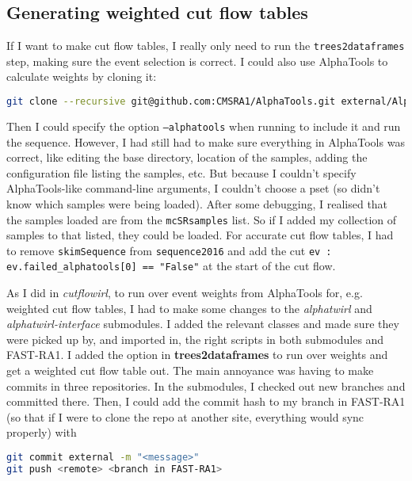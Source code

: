 \subsection{Generating weighted cut flow tables}

If I want to make cut flow tables, I really only need to run the \texttt{trees2dataframes} step, making sure the event selection is correct. I could also use AlphaTools to calculate weights by cloning it:

\begin{lstlisting}[belowskip=-0.7cm, language=sh, numbers=none]
git clone --recursive git@github.com:CMSRA1/AlphaTools.git external/AlphaTools
\end{lstlisting}

Then I could specify the option \texttt{--alphatools} when running to include it and run the sequence. However, I had still had to make sure everything in AlphaTools was correct, like editing the base directory, location of the samples, adding the configuration file listing the samples, etc. But because I couldn't specify AlphaTools-like command-line arguments, I couldn't choose a pset (so didn't know which samples were being loaded). After some debugging, I realised that the samples loaded are from the \texttt{mcSRsamples} list. So if I added my collection of samples to that listed, they could be loaded. For accurate cut flow tables, I had to remove \texttt{skimSequence} from \texttt{sequence2016} and add the cut \texttt{ev : ev.failed\_alphatools[0] == "False"} at the start of the cut flow.

As I did in \emph{cutflowirl}, to run over event weights from AlphaTools for, e.g. weighted cut flow tables, I had to make some changes to the \emph{alphatwirl} and \emph{alphatwirl-interface} submodules. I added the relevant classes and made sure they were picked up by, and imported in, the right scripts in both submodules and FAST-RA1. I added the option in \textbf{trees2dataframes} to run over weights and get a weighted cut flow table out. The main annoyance was having to make commits in three repositories. In the submodules, I checked out new branches and committed there. Then, I could add the commit hash to my branch in FAST-RA1 (so that if I were to clone the repo at another site, everything would sync properly) with

\begin{lstlisting}[belowskip=-0.7cm, language=sh, numbers=none]
git commit external -m "<message>"
git push <remote> <branch in FAST-RA1>
\end{lstlisting}


